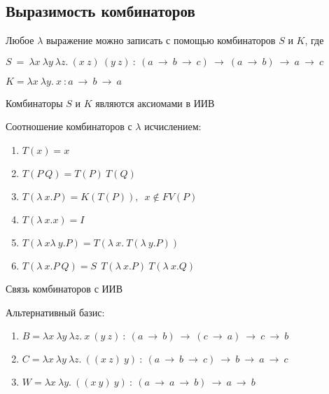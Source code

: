 	 \subsection{Выразимость комбинаторов}
	 \begin{statement}Любое $\lambda$ выражение можно записать с помощью комбинаторов $S$ и $K$, где\end{statement}
	 $S\:=\:\lambda x\:\lambda y\:\lambda z.\:(x\:z)\:(y\:z)\: : \:(a\:\rightarrow\:b\:\rightarrow\:c)\:\rightarrow\:(a\:\rightarrow\:b)\:\rightarrow\:a\:\rightarrow\:c$\par 
	 $K=\lambda x\:\lambda y.\:x\: : a\:\rightarrow\:b\:\rightarrow\:a$\par 
	 \begin{statement}Комбинаторы $S$ и $K$ являются аксиомами в ИИВ\end{statement}
	\begin{statement}Соотношение комбинаторов с $\lambda$ исчислением:\end{statement}
	\begin{enumerate}
		\item $T(x)=x$
		\item $T(P\:Q)=T(P)\:T(Q)$
		\item $T(\lambda\:x.P)=K(T(P)),\enspace x\not\in FV(P)$
		\item $T(\lambda\:x.x)=I$
		\item $T(\lambda\:x\lambda\:y.P)=T(\lambda\:x.\:T(\lambda\:y.P))$
		\item $T(\lambda\:x.P\:Q)=S\:\:T(\lambda\:x.P)\:T(\lambda\:x.Q)$
	\end{enumerate}		
	\begin{statement}Связь комбинаторов с ИИВ\end{statement}	
	\begin{statement}Альтернативный базис:\end{statement}
	 \begin{enumerate}
		\item $B=\lambda x\:\lambda y\:\lambda z.\:x\:(y\:z)\: : \:(a\:\rightarrow\:b)\:\rightarrow\:(c\:\rightarrow\:a)\:\rightarrow\:c\:\rightarrow\:b$
		\item $C=\lambda x\:\lambda y\:\lambda z.\:((x\:z)\:y)\: : \:(a\:\rightarrow\:b\:\rightarrow\:c)\:\rightarrow\:b\:\rightarrow\:a\:\rightarrow\:c$
		\item $W=\lambda x\:\lambda y.\:((x\:y)\:y)\: : \: (a\:\rightarrow\:a\:\rightarrow\:b)\:\rightarrow\:a\:\rightarrow\:b$
	 \end{enumerate}

